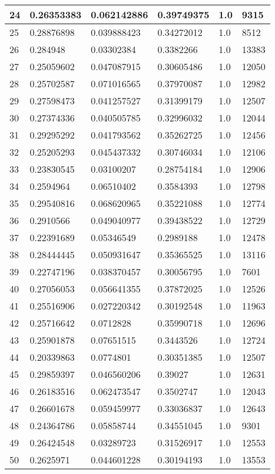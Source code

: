 \begin{longtable}{|l|l|l|l|l|l|}
24 & 0.26353383 & 0.062142886 & 0.39749375 & 1.0 & 9315 \\ \hline 
25 & 0.28876898 & 0.039888423 & 0.34272012 & 1.0 & 8512 \\ \hline 
26 & 0.284948 & 0.03302384 & 0.3382266 & 1.0 & 13383 \\ \hline 
27 & 0.25059602 & 0.047087915 & 0.30605486 & 1.0 & 12050 \\ \hline 
28 & 0.25702587 & 0.071016565 & 0.37970087 & 1.0 & 12982 \\ \hline 
29 & 0.27598473 & 0.041257527 & 0.31399179 & 1.0 & 12507 \\ \hline 
30 & 0.27374336 & 0.040505785 & 0.32996032 & 1.0 & 12044 \\ \hline 
31 & 0.29295292 & 0.041793562 & 0.35262725 & 1.0 & 12456 \\ \hline 
32 & 0.25205293 & 0.045437332 & 0.30746034 & 1.0 & 12106 \\ \hline 
33 & 0.23830545 & 0.03100207 & 0.28754184 & 1.0 & 12906 \\ \hline 
34 & 0.2594964 & 0.06510402 & 0.3584393 & 1.0 & 12798 \\ \hline 
35 & 0.29540816 & 0.068620965 & 0.35221088 & 1.0 & 12774 \\ \hline 
36 & 0.2910566 & 0.049040977 & 0.39438522 & 1.0 & 12729 \\ \hline 
37 & 0.22391689 & 0.05346549 & 0.2989188 & 1.0 & 12478 \\ \hline 
38 & 0.28444445 & 0.050931647 & 0.35365525 & 1.0 & 13116 \\ \hline 
39 & 0.22747196 & 0.038370457 & 0.30056795 & 1.0 & 7601 \\ \hline 
40 & 0.27056053 & 0.056641355 & 0.37872025 & 1.0 & 12526 \\ \hline 
41 & 0.25516906 & 0.027220342 & 0.30192548 & 1.0 & 11963 \\ \hline 
42 & 0.25716642 & 0.0712828 & 0.35990718 & 1.0 & 12696 \\ \hline 
43 & 0.25901878 & 0.07651515 & 0.3443526 & 1.0 & 12724 \\ \hline 
44 & 0.20339863 & 0.0774801 & 0.30351385 & 1.0 & 12507 \\ \hline 
45 & 0.29859397 & 0.046560206 & 0.39027 & 1.0 & 12631 \\ \hline 
46 & 0.26183516 & 0.062473547 & 0.3502747 & 1.0 & 12043 \\ \hline 
47 & 0.26601678 & 0.059459977 & 0.33036837 & 1.0 & 12643 \\ \hline 
48 & 0.24364786 & 0.05858744 & 0.34551045 & 1.0 & 9301 \\ \hline 
49 & 0.26424548 & 0.03289723 & 0.31526917 & 1.0 & 12553 \\ \hline 
50 & 0.2625971 & 0.044601228 & 0.30194193 & 1.0 & 13553 \\ \hline 
\end{longtable}